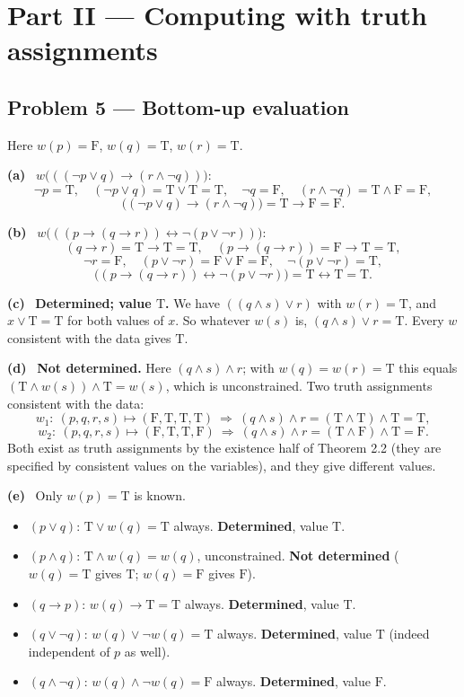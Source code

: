 \documentclass[11pt]{article}
\newcommand{\T}{\mathrm{T}}
\newcommand{\F}{\mathrm{F}}
\newcommand{\solpart}[1]{\smallskip\noindent\textbf{(#1)}\ }
\newcommand{\prob}[2]{\subsection*{Problem #1 --- #2}}
\begin{document}
\section*{Part II --- Computing with truth assignments}

\prob{5}{Bottom-up evaluation}

Here $w(p)=\F$, $w(q)=\T$, $w(r)=\T$.

\solpart{a} $w\big(((\lnot p\lor q)\to(r\land\lnot q))\big)$:
\[
\lnot p=\T,\quad (\lnot p\lor q)=\T\lor\T=\T,\quad \lnot q=\F,\quad
(r\land\lnot q)=\T\land\F=\F,
\]
\[
\big((\lnot p\lor q)\to(r\land\lnot q)\big)=\T\to\F=\boxed{\F}.
\]

\solpart{b} $w\big(((p\to(q\to r))\leftrightarrow\lnot(p\lor\lnot r))\big)$:
\[
(q\to r)=\T\to\T=\T,\quad (p\to(q\to r))=\F\to\T=\T,
\]
\[
\lnot r=\F,\quad (p\lor\lnot r)=\F\lor\F=\F,\quad \lnot(p\lor\lnot r)=\T,
\]
\[
\big((p\to(q\to r))\leftrightarrow\lnot(p\lor\lnot r)\big)=\T\leftrightarrow\T
=\boxed{\T}.
\]

\solpart{c} \textbf{Determined; value $\T$.} We have
$((q\land s)\lor r)$ with $w(r)=\T$, and $x\lor\T=\T$ for both values of $x$.
So whatever $w(s)$ is, $(q\land s)\lor r=\T$. Every $w$ consistent with the data
gives $\T$.

\solpart{d} \textbf{Not determined.} Here $(q\land s)\land r$; with $w(q)=w(r)=\T$
this equals $(\T\land w(s))\land\T=w(s)$, which is unconstrained. Two truth
assignments consistent with the data:
\[
w_1:\ (p,q,r,s)\mapsto(\F,\T,\T,\T)\ \Rightarrow\ (q\land s)\land r=(\T\land\T)\land\T=\T,
\]
\[
w_2:\ (p,q,r,s)\mapsto(\F,\T,\T,\F)\ \Rightarrow\ (q\land s)\land r=(\T\land\F)\land\T=\F.
\]
Both exist as truth assignments by the existence half of Theorem 2.2 (they are
specified by consistent values on the variables), and they give different values.

\solpart{e} Only $w(p)=\T$ is known.
\begin{itemize}[nosep]
\item $(p\lor q)$: $\T\lor w(q)=\T$ always. \textbf{Determined}, value $\T$.
\item $(p\land q)$: $\T\land w(q)=w(q)$, unconstrained. \textbf{Not determined}
($w(q)=\T$ gives $\T$; $w(q)=\F$ gives $\F$).
\item $(q\to p)$: $w(q)\to\T=\T$ always. \textbf{Determined}, value $\T$.
\item $(q\lor\lnot q)$: $w(q)\lor\lnot w(q)=\T$ always. \textbf{Determined}, value
$\T$ (indeed independent of $p$ as well).
\item $(q\land\lnot q)$: $w(q)\land\lnot w(q)=\F$ always. \textbf{Determined},
value $\F$.
\end{itemize}
\end{document}
